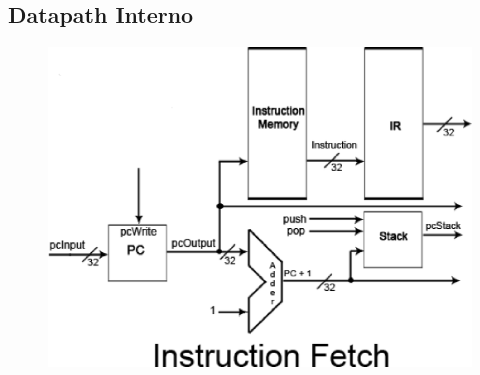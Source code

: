 	\subsection{Datapath Interno}
	\begin{figure}[h!]
		\begin{center}
		\includegraphics[scale=0.8]{./datapath/step1.eps}
		\end{center}
	\end{figure}
	